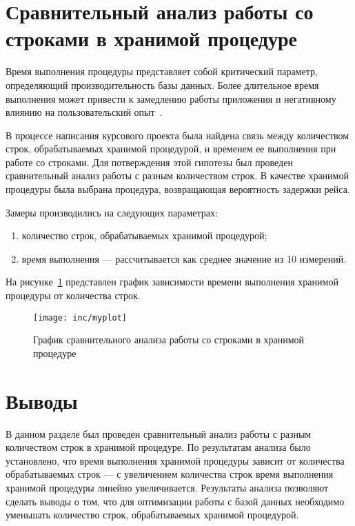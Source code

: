\section{Сравнительный анализ работы со \newline строками в хранимой процедуре}

Время выполнения процедуры представляет собой критический параметр, определяющий производительность базы данных.
Более длительное время выполнения может привести к замедлению работы приложения и негативному влиянию на пользовательский опыт~\cite{microsoft}.

В процессе написания курсового проекта была найдена связь между количеством строк, обрабатываемых хранимой процедурой, и временем ее выполнения при работе со строками.
Для потверждения этой гипотезы был проведен сравнительный анализ работы с разным количеством строк.
В качестве хранимой процедуры была выбрана процедура, возвращающая вероятность задержки рейса.


Замеры производились на следующих параметрах:
\begin{enumerate}
    \item количество строк, обрабатываемых хранимой процедурой;
    \item время выполнения --- рассчитывается как среднее значение из 10 измерений.
\end{enumerate}

На рисунке~\ref{fig:myplot} представлен график зависимости времени выполнения хранимой процедуры от количества строк.

\begin{figure}[H]
    \centering
    \texttt{[image: inc/myplot]}
    \caption{График сравнительного анализа работы со строками в хранимой процедуре}
    \label{fig:myplot}
\end{figure}

\section*{Выводы}
В данном разделе был проведен сравнительный анализ работы с разным количеством строк в хранимой процедуре.
По результатам анализа было установлено, что время выполнения хранимой процедуры зависит от количества обрабатываемых строк --- с увеличением количества строк время выполнения хранимой процедуры линейно увеличивается.
Результаты анализа позволяют сделать выводы о том, что для оптимизации работы с базой данных необходимо уменьшать количество строк, обрабатываемых хранимой процедурой.



